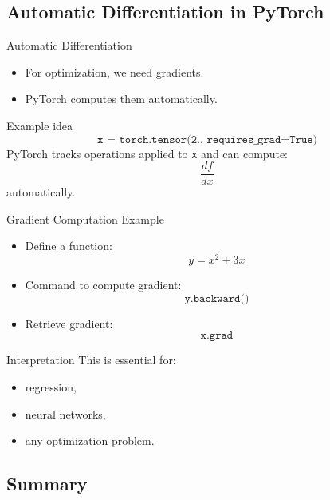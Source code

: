 \documentclass[aspectratio=169]{beamer}
\begin{document}
\subsection{Automatic Differentiation in PyTorch}

\begin{frame}{Automatic Differentiation}

\begin{itemize}
    \item For optimization, we need gradients.
    \item PyTorch computes them automatically.
\end{itemize}

\pause

\begin{block}{Example idea}
$$
\texttt{x = torch.tensor(2., requires\_grad=True)}
$$
PyTorch tracks operations applied to \texttt{x}
and can compute:
$$
\frac{d f}{dx}
$$
automatically.
\end{block}

\end{frame}

\begin{frame}{Gradient Computation Example}

\begin{itemize}
    \item Define a function:
$$
y = x^2 + 3x
$$
    \item Command to compute gradient:
$$
\texttt{y.backward()}
$$
    \item Retrieve gradient:
$$
\texttt{x.grad}
$$
\end{itemize}

\pause

\begin{alertblock}{Interpretation}
This is essential for:
\begin{itemize}
    \item regression,
    \item neural networks,
    \item any optimization problem.
\end{itemize}
\end{alertblock}

\end{frame}

\subsection{Summary}
\end{document}
